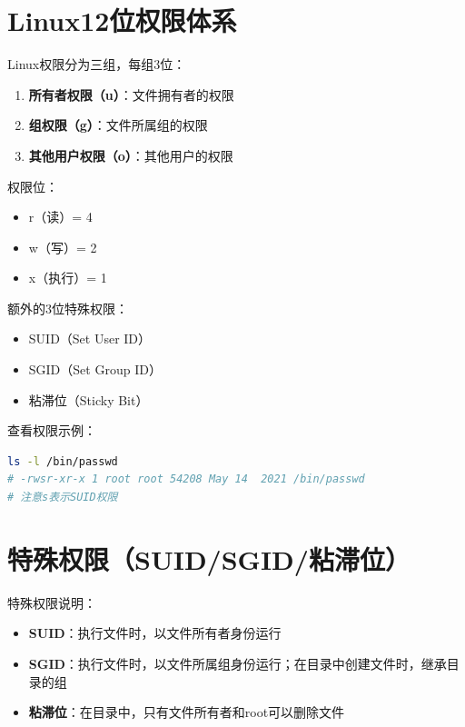 \documentclass[12pt,UTF8]{ctexbook}
\begin{document}
\section{Linux12位权限体系}
\label{sec:permission-system}

Linux权限分为三组，每组3位：

\begin{enumerate}
    \item \textbf{所有者权限（u）}：文件拥有者的权限
    \item \textbf{组权限（g）}：文件所属组的权限
    \item \textbf{其他用户权限（o）}：其他用户的权限
\end{enumerate}

权限位：
\begin{itemize}
    \item r（读）= 4
    \item w（写）= 2
    \item x（执行）= 1
\end{itemize}

额外的3位特殊权限：
\begin{itemize}
    \item SUID（Set User ID）
    \item SGID（Set Group ID）
    \item 粘滞位（Sticky Bit）
\end{itemize}

查看权限示例：
\begin{lstlisting}[language=bash]
ls -l /bin/passwd
# -rwsr-xr-x 1 root root 54208 May 14  2021 /bin/passwd
# 注意s表示SUID权限
\end{lstlisting}

\section{特殊权限（SUID/SGID/粘滞位）}
\label{sec:special-permissions}

特殊权限说明：

\begin{itemize}
    \item \textbf{SUID}：执行文件时，以文件所有者身份运行
    \item \textbf{SGID}：执行文件时，以文件所属组身份运行；在目录中创建文件时，继承目录的组
    \item \textbf{粘滞位}：在目录中，只有文件所有者和root可以删除文件
\end{itemize}
\end{document}
